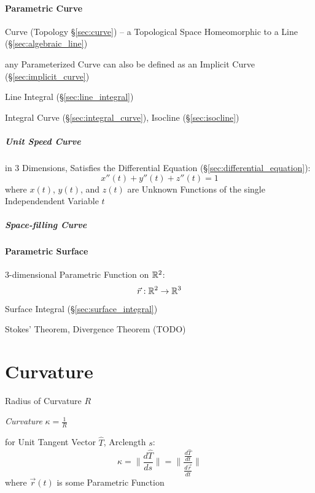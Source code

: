 \paragraph{Parametric Curve}\label{sec:parametric_curve}\hfill

\fist Curve (Topology \S\ref{sec:curve}) -- a Topological Space Homeomorphic to
a Line (\S\ref{sec:algebraic_line})

any Parameterized Curve can also be defined as an Implicit Curve
(\S\ref{sec:implicit_curve})

Line Integral (\S\ref{sec:line_integral})

Integral Curve (\S\ref{sec:integral_curve}), Isocline (\S\ref{sec:isocline})



\subparagraph{Unit Speed Curve}\label{sec:unit_speed_curve}\hfill

in 3 Dimensions, Satisfies the Differential Equation
(\S\ref{sec:differential_equation}):
\[
  x''(t) + y''(t) + z''(t) = 1
\]
where $x(t)$, $y(t)$, and $z(t)$ are Unknown Functions of the single
Independendent Variable $t$



\subparagraph{Space-filling Curve}\label{sec:space_filling_curve}\hfill



\paragraph{Parametric Surface}\label{sec:parametric_surface}\hfill

3-dimensional Parametric Function on
$\mathbb{R}^2$:
\[
  \vec{r} : \mathbb{R}^2 \rightarrow \mathbb{R}^3
\]

Surface Integral (\S\ref{sec:surface_integral})

Stokes' Theorem, Divergence Theorem (TODO)



\section{Curvature}\label{sec:curvature}

Radius of Curvature $R$

\emph{Curvature} $\kappa = \frac{1}{R}$

for Unit Tangent Vector $\hat{T}$, Arclength $s$:
\[
  \kappa = \|\frac{d\hat{T}}{ds}\|
    = \|\frac{\frac{d\hat{T}}{dt}}{\frac{d\vec{r}}{dt}}\|
\]
where $\vec{r}(t)$ is some Parametric Function

